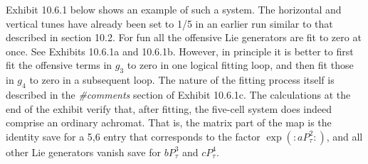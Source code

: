 Exhibit 10.6.1 below shows an example of such a system.  The horizontal
and vertical tunes have already been set to 1/5 in an earlier run similar
to that described in section 10.2.  For fun all the offensive Lie
generators are fit to zero at once.  See Exhibits 10.6.1a and 10.6.1b.
However, in principle it is better to first fit the offensive terms in
$g_3$ to zero in one logical fitting loop, and then fit those in $g_4$ to
zero in a subsequent loop.  The nature of the fitting process itself is
described in the {\em \#comments} section of Exhibit 10.6.1c.  The
calculations at the end of the exhibit verify that, after fitting, the five-cell system does indeed
comprise an ordinary achromat.  That is, the matrix part of the map is
the identity save for a 5,6 entry that corresponds to the factor $\exp
(:aP^2_{\tau}:)$, and all other Lie generators vanish save for $bP^3_{\tau}$
and $cP^4_{\tau}$.

